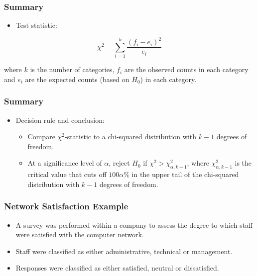 \documentclass[12pt]{beamer}
\begin{document}
		\begin{frame}
			\frametitle{Summary}
			
			\begin{itemize}[label={\color{blue}$\blacktriangleright$}]
				\item Test statistic:
			\end{itemize}
			
			\medskip
			
			\[
			\chi^2 = \sum_{i=1}^k \frac{(f_i - e_i)^2}{e_i}
			\]
			
			\medskip
			
			where $k$ is the number of categories, $f_i$ are the observed counts in each category and $e_i$ are the expected counts (based on $H_0$) in each category.
			
		\end{frame}
		\begin{frame}
			\frametitle{Summary}
			
			\begin{itemize}[label={\color{blue}$\blacktriangleright$}]
				\item Decision rule and conclusion:
				\begin{itemize}[label={\color{blue}$\blacktriangleright$}]
					\item Compare $\chi^2$-statistic to a chi-squared distribution with $k-1$ degrees of freedom.
					\item At a significance level of $\alpha$, reject $H_0$ if $\chi^2 > \chi^2_{\alpha,k-1}$, where $\chi^2_{\alpha,k-1}$ is the critical value that cuts off $100\alpha\%$ in the upper tail of the chi-squared distribution with $k-1$ degrees of freedom.
				\end{itemize}
			\end{itemize}
			
		\end{frame}
		\begin{frame}
			\frametitle{Network Satisfaction Example}
			
			\begin{itemize}[label={\color{blue}$\blacktriangleright$}]
				\item A survey was performed within a company to assess the degree to which staff were satisfied with the computer network.
				
				\item Staff were classified as either administrative, technical or management.
				
				\item Responses were classified as either satisfied, neutral or dissatisfied.
			\end{itemize}
			
		\end{frame}
\end{document}
